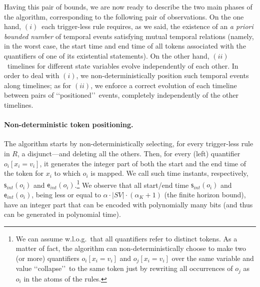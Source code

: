 Having this pair of bounds, 
we are now ready to describe the two main phases of the algorithm, corresponding to the following pair of observations.
On the one hand, $(i)$~each trigger-less rule requires, as we said,
the existence of an \emph{a priori bounded number} of temporal events satisfying mutual temporal relations (namely, in the worst case, the start time and end time of all tokens associated with the quantifiers of one of its existential statements).
On the other hand, $(ii)$~timelines for different state variables evolve independently of each other.
In order to deal with $(i)$, we non-deterministically position such temporal events along timelines; as for $(ii)$, we enforce a correct evolution of each timeline between pairs of \lq\lq positioned\rq\rq\ events, completely independently of the other timelines.



\paragraph{Non-deterministic token positioning.}
The algorithm starts by non-determin\-istically selecting, for every trigger-less rule in $R$, a disjunct---and deleting all the others. Then, for every (left) quantifier $o_i[x_i=v_i]$, it generates the integer part of both the start and the end time of the token for $x_i$ to which $o_i$ is mapped. We call such time instants, respectively, $\mathsf{s}_{int}(o_i)$ and $\mathsf{e}_{int}(o_i)$.\footnote{We can assume w.l.o.g.\ that all quantifiers refer to distinct tokens. As a matter of fact, the algorithm can non-deterministically choose to make two (or more) quantifiers $o_i[x_i=v_i]$ and $o_j[x_i=v_i]$ over the same variable and value \lq\lq collapse\rq\rq\ to the same token just by rewriting all occurrences of $o_j$ as $o_i$ in the atoms of the rules.} We observe that all start/end time $\mathsf{s}_{int}(o_i)$ and $\mathsf{e}_{int}(o_i)$, being less or equal to $\alpha \cdot |SV| \cdot (\alpha_K+1)$ (the finite horizon bound), have an integer part that can be encoded with polynomially many bits (and thus can be generated in polynomial time). 

